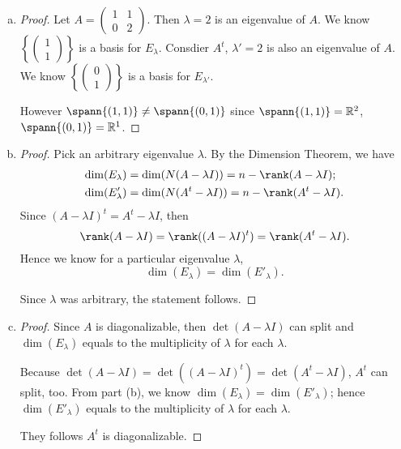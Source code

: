 \begin{Exercise}
\begin{enumerate}[(a)]
\item
\begin{proof}
Let $A = \begin{pmatrix}
1 & 1 \\
0 & 2
\end{pmatrix}$. Then $\lambda = 2$ is an eigenvalue of $A$. We know $\left\{\begin{pmatrix}
1 \\
1
\end{pmatrix} \right\}$ is a basis for $E_{\lambda}$. Consdier $A^t$, $\lambda' = 2$ is also an eigenvalue of $A$. We know $\left\{\begin{pmatrix}
0 \\
1
\end{pmatrix} \right\}$ is a basis for $E_{\lambda'}$.

However $\spann\{(1,1)\} \neq \spann\{(0,1)\}$ since $\spann\{(1,1)\} = \mathbb{R}^2$, $\spann\{(0,1)\} = \mathbb{R}^1$.
\end{proof}

\item
\begin{proof}
Pick an arbitrary eigenvalue $\lambda$. By the Dimension Theorem, we have
\begin{align*}
\dim(E_{\lambda}) &= \dim(N(A-\lambda I)) = n-\rank(A-\lambda I); \\
\dim(E'_{\lambda}) &= \dim(N(A^t-\lambda I)) = n-\rank(A^t-\lambda I).
\end{align*}
Since $(A-\lambda I)^t = A^t - \lambda I$, then 
$$
\rank(A-\lambda I) = \rank((A-\lambda I)^t) = \rank(A^t-\lambda I).
$$
Hence we know for a particular eigenvalue $\lambda$,
$$
\dim(E_{\lambda}) = \dim(E'_{\lambda}).
$$

Since $\lambda$ was arbitrary, the statement follows.
\end{proof}

\item
\begin{proof}
Since $A$ is diagonalizable, then $\det(A-\lambda I)$ can split and $\dim(E_{\lambda})$ equals to the multiplicity of $\lambda$ for each $\lambda$.

Because $\det(A-\lambda I) = \det((A-\lambda I)^t) = \det(A^t-\lambda I)$, $A^t$ can split, too. From part (b), we know $\dim(E_{\lambda}) = \dim(E'_{\lambda})$; hence $\dim(E'_{\lambda})$ equals to the multiplicity of $\lambda$ for each $\lambda$.

They follows $A^t$ is diagonalizable.
\end{proof}
\end{enumerate}
\end{Exercise}